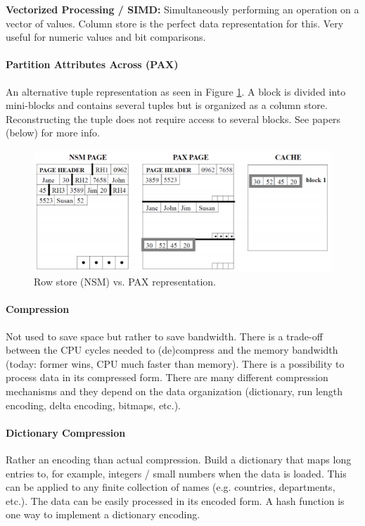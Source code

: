 \textbf{Vectorized Processing / SIMD:} Simultaneously performing an operation on a vector of values. Column store is the perfect data representation for this. Very useful for numeric values and bit comparisons.

\paragraph{Partition Attributes Across (PAX)}
An alternative tuple representation as seen in Figure \ref{fig:pax}. A block is divided into mini-blocks and contains several tuples but is organized as a column store. Reconstructing the tuple does not require access to several blocks. See papers (below) for more info.

\begin{figure}[h]
	\centering
	\includegraphics[scale=0.8]{images/2-pax.PNG}
	\caption{Row store (NSM) vs. PAX representation.}
	\label{fig:pax}
\end{figure}

\paragraph{Compression}
Not used to save space but rather to save bandwidth. There is a trade-off between the CPU cycles needed to (de)compress and the memory bandwidth (today: former wins, CPU much faster than memory). There is a possibility to process data in its compressed form. There are many different compression mechanisms and they depend on the data organization (dictionary, run length encoding, delta encoding, bitmaps, etc.).

\paragraph{Dictionary Compression}
Rather an encoding than actual compression. Build a dictionary that maps long entries to, for example, integers / small numbers when the data is loaded. This can be applied to any finite collection of names (e.g. countries, departments, etc.). The data can be easily processed in its encoded form. A hash function is one way to implement a dictionary encoding.

